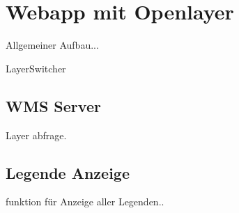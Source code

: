 \section{Webapp mit Openlayer}

Allgemeiner Aufbau...

LayerSwitcher


\subsection{WMS Server}

Layer abfrage.

\subsection{Legende Anzeige}

funktion für Anzeige aller Legenden..
